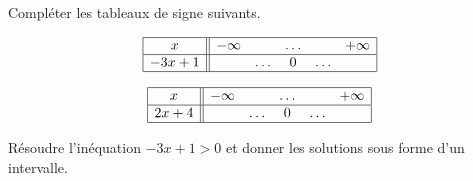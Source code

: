 
\begin{exercice}\label{exosmath-0321}

    Compléter les tableaux de signe suivants.
    \begin{multicols}{2}
    \begin{equation*}
        \begin{array}[]{|c||ccccc|}
            \hline
             x&-\infty&&\ldots&&+\infty\\
              \hline
              -3x+1&&\ldots&0&\ldots&\\ 
              \hline 
               \end{array}
           \end{equation*}


    \begin{equation*}
        \begin{array}[]{|c||ccccc|}
            \hline
             x&-\infty&&\ldots&&+\infty\\
              \hline
              2x+4&&\ldots&0&\ldots&\\ 
              \hline 
               \end{array}
           \end{equation*}

    \end{multicols}
    Résoudre l'inéquation \( -3x+1>0\) et donner les solutions sous forme d'un intervalle.

\end{exercice}
